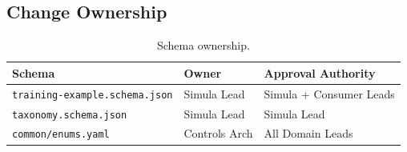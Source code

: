 \subsection{Change Ownership}

\begin{table}[htbp]
\centering
\caption{Schema ownership.}
\label{tab:schema-ownership}
\footnotesize
\begin{tabularx}{\textwidth}{@{}l l X@{}}
\toprule
\textbf{Schema} & \textbf{Owner} & \textbf{Approval Authority} \\
\midrule
\texttt{training-example.schema.json} & Simula Lead & Simula + Consumer Leads \\
\texttt{taxonomy.schema.json} & Simula Lead & Simula Lead \\
\texttt{common/enums.yaml} & Controls Arch & All Domain Leads \\
\bottomrule
\end{tabularx}
\end{table}